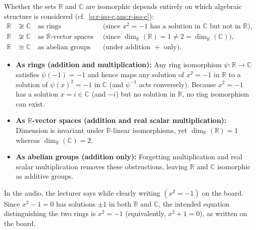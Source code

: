 \begin{content}
Whether the sets $\mathbb{R}$ and $\mathbb{C}$ are isomorphic depends entirely on which algebraic structure is considered (cf.\ \cref{q:r-iso-c,ans:r-iso-c}):
\begin{align*}
\mathbb{R} &\not\cong \mathbb{C} \quad \text{as rings} && \text{(since } x^2 = -1 \text{ has a solution in } \mathbb{C} \text{ but not in } \mathbb{R}\text{)}, \\
\mathbb{R} &\not\cong \mathbb{C} \quad \text{as $\mathbb{R}$-vector spaces} && \text{(since } \dim_{\mathbb{R}}(\mathbb{R}) = 1 \neq 2 = \dim_{\mathbb{R}}(\mathbb{C})\text{)}, \\
\mathbb{R} &\cong \mathbb{C} \quad \text{as abelian groups} && \text{(under addition } + \text{ only)}.
\end{align*}

\begin{steps}
\begin{itemize}
    \item \textbf{As rings (addition and multiplication):} Any ring isomorphism $\psi \colon \mathbb{R} \to \mathbb{C}$ satisfies $\psi(-1) = -1$ and hence maps any solution of $x^2 = -1$ in $\mathbb{R}$ to a solution of $\psi(x)^2 = -1$ in $\mathbb{C}$ (and $\psi^{-1}$ acts conversely). Because $x^2 = -1$ has a solution $x = i \in \mathbb{C}$ (and $-i$) but no solution in $\mathbb{R}$, no ring isomorphism can exist.
    \item \textbf{As $\mathbb{R}$-vector spaces (addition and real scalar multiplication):} Dimension is invariant under $\mathbb{R}$-linear isomorphisms, yet $\dim_{\mathbb{R}}(\mathbb{R}) = 1$ whereas $\dim_{\mathbb{R}}(\mathbb{C}) = 2$.
    \item \textbf{As abelian groups (addition only):} Forgetting multiplication and real scalar multiplication removes these obstructions, leaving $\mathbb{R}$ and $\mathbb{C}$ isomorphic as additive groups.
\end{itemize}
\end{steps}
\end{content}

\begin{aiNote}[Spoken Slip vs.\ Board Equation: \texorpdfstring{$x^2 - 1$ vs.\ $x^2 = -1$}{x\textasciicircum 2 - 1 vs. x\textasciicircum 2 = -1}]
In the audio, the lecturer says  while clearly writing $(x^2 = -1)$ on the board. Since $x^2 - 1 = 0$ has solutions $\pm 1$ in both $\mathbb{R}$ and $\mathbb{C}$, the intended equation distinguishing the two rings is $x^2 = -1$ (equivalently, $x^2 + 1 = 0$), as written on the board.
\end{aiNote}

